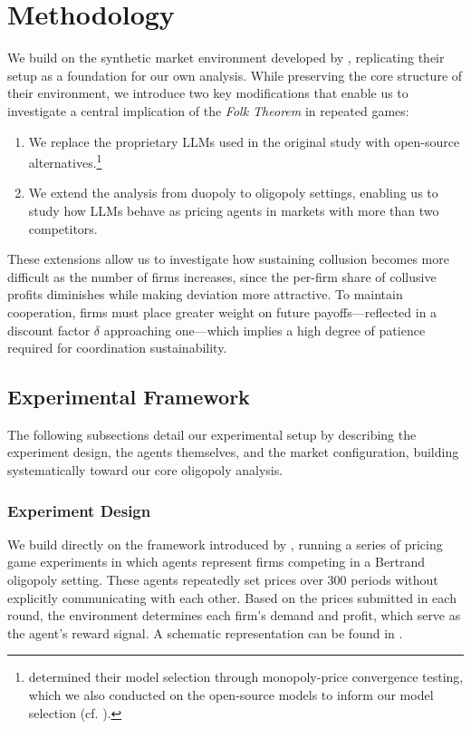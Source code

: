 \section{Methodology}\label{sec:meth}

We build on the synthetic market environment developed by \textcite{fish_algorithmic_2025}, replicating their setup as a foundation for our own analysis. While preserving the core structure of their environment, we introduce two key modifications that enable us to investigate a central implication of the \emph{Folk Theorem} in repeated games:

\begin{enumerate}
    \item We replace the proprietary LLMs used in the original study with open-source alternatives.\footnote{\noindent\textcite{fish_algorithmic_2025} determined their model selection through monopoly-price convergence testing, which we also conducted on the open-source models to inform our model selection (cf. ).} 
    \item We extend the analysis from duopoly to oligopoly settings, enabling us to study how LLMs behave as pricing agents in markets with more than two competitors. 
\end{enumerate}

These extensions allow us to investigate how sustaining collusion becomes more difficult as the number of firms increases, since the per-firm share of collusive profits diminishes while making deviation more attractive. To maintain cooperation, firms must place greater weight on future payoffs—reflected in a discount factor $\delta$ approaching one—which implies a high degree of patience required for coordination sustainability.

\subsection{Experimental Framework}

The following subsections detail our experimental setup by describing the experiment design, the agents themselves, and the market configuration, building systematically toward our core oligopoly analysis.

\subsubsection*{Experiment Design}

We build directly on the framework introduced by \textcite{fish_algorithmic_2025}, running a series of pricing game experiments in which agents represent firms competing in a Bertrand oligopoly setting. These agents repeatedly set prices over 300 periods without explicitly communicating with each other. Based on the prices submitted in each round, the environment determines each firm's demand and profit, which serve as the agent's reward signal. A schematic representation can be found in .

